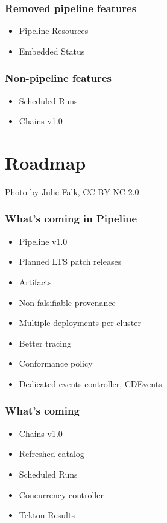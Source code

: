 \documentclass[aspectratio=169,11pt,hyperref={colorlinks=true}]{beamer}
\begin{document}
\begin{blackframe}
  \frametitle{Removed pipeline features}
  \begin{itemize}
    \item Pipeline Resources
    \item Embedded Status
  \end{itemize}
\end{blackframe}

\begin{blackframe}
  \frametitle{Non-pipeline features}
  \begin{itemize}
    \item Scheduled Runs
    \item Chains v1.0
  \end{itemize}
\end{blackframe}

\section[Roadmap]{Roadmap \faRobot\faCat}
\begin{sectionwithpicrx}{Photo by \href{https://www.flickr.com/photos/piper/}{\underline{Julie Falk}}, CC BY-NC 2.0}
\end{sectionwithpicrx}

\begin{blackframe}
  \frametitle{What's coming in Pipeline}
  \begin{itemize}
    \item Pipeline v1.0
    \item Planned LTS patch releases
    \item Artifacts
    \item Non falsifiable provenance
    \item Multiple deployments per cluster
    \item Better tracing
    \item Conformance policy
    \item Dedicated events controller, CDEvents
  \end{itemize}
\end{blackframe}

\begin{blackframe}
  \frametitle{What's coming}
  \begin{itemize}
    \item Chains v1.0
    \item Refreshed catalog
    \item Scheduled Runs
    \item Concurrency controller
    \item Tekton Results
  \end{itemize}
\end{blackframe}
\end{document}
